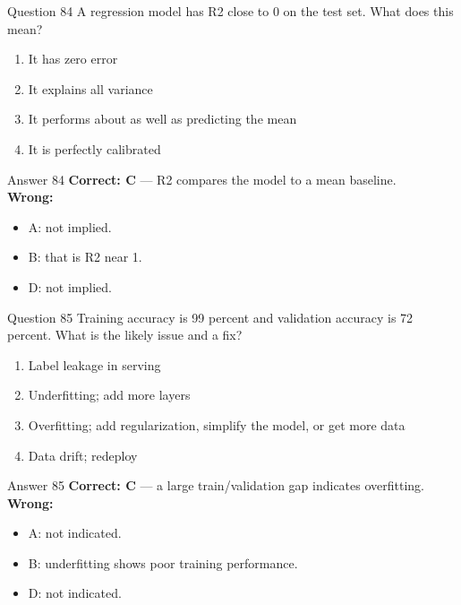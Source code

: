 \documentclass[aspectratio=169,11pt]{beamer}
\begin{document}
	\begin{frame}{Question 84}
		A regression model has R2 close to 0 on the test set. What does this mean?
		\begin{enumerate}[label=\Alph*.]
			\item It has zero error
			\item It explains all variance
			\item It performs about as well as predicting the mean
			\item It is perfectly calibrated
		\end{enumerate}
	\end{frame}
	\begin{frame}{Answer 84}
		\textbf{Correct: C} --- R2 compares the model to a mean baseline.\\
		\vspace{0.5em}
		\textbf{Wrong:}
		\begin{itemize}
			\item A: not implied.
			\item B: that is R2 near 1.
			\item D: not implied.
		\end{itemize}
	\end{frame}
	
	\begin{frame}{Question 85}
		Training accuracy is 99 percent and validation accuracy is 72 percent. What is the likely issue and a fix?
		\begin{enumerate}[label=\Alph*.]
			\item Label leakage in serving
			\item Underfitting; add more layers
			\item Overfitting; add regularization, simplify the model, or get more data
			\item Data drift; redeploy
		\end{enumerate}
	\end{frame}
	\begin{frame}{Answer 85}
		\textbf{Correct: C} --- a large train/validation gap indicates overfitting.\\
		\vspace{0.5em}
		\textbf{Wrong:}
		\begin{itemize}
			\item A: not indicated.
			\item B: underfitting shows poor training performance.
			\item D: not indicated.
		\end{itemize}
	\end{frame}
	
\end{document}
